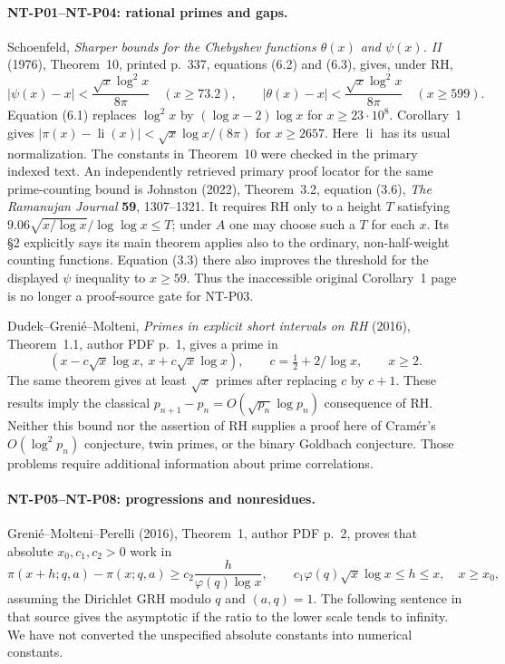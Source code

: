 \documentclass[11pt,a4paper]{article}
\begin{document}
\paragraph{NT-P01--NT-P04: rational primes and gaps.}
Schoenfeld, \emph{Sharper bounds for the Chebyshev functions
$\theta(x)$ and $\psi(x)$. II} (1976), Theorem~10, printed p.~337,
equations (6.2) and (6.3), gives, under RH,
\[
 |\psi(x)-x|<\frac{\sqrt{x}\log^2x}{8\pi}\quad(x\ge73.2),\qquad
 |\theta(x)-x|<\frac{\sqrt{x}\log^2x}{8\pi}\quad(x\ge599).
\]
Equation (6.1) replaces $\log^2x$ by $(\log x-2)\log x$ for
$x\ge23\cdot10^8$.  Corollary~1 gives
$|\pi(x)-\operatorname{li}(x)|<\sqrt{x}\log x/(8\pi)$ for
$x\ge2657$.  Here $\operatorname{li}$ has its usual normalization.
The constants in Theorem~10 were checked in the primary indexed text.
An independently retrieved primary proof locator for the same
prime-counting bound is Johnston (2022), Theorem~3.2, equation (3.6),
\emph{The Ramanujan Journal} \textbf{59}, 1307--1321.
It requires RH only to a height $T$ satisfying
$9.06\sqrt{x/\log x}/\log\log x\le T$; under $A$ one may choose
such a $T$ for each $x$.  Its \S2 explicitly says its main theorem applies
also to the ordinary, non-half-weight counting functions.  Equation (3.3)
there also improves the threshold for the displayed $\psi$ inequality
to $x\ge59$.  Thus the inaccessible original Corollary~1 page is no
longer a proof-source gate for NT-P03.

Dudek--Greni\'e--Molteni, \emph{Primes in explicit short intervals on RH}
(2016), Theorem~1.1, author PDF p.~1, gives a prime in
\[
 (x-c\sqrt{x}\log x,\ x+c\sqrt{x}\log x),
 \qquad c=\tfrac12+2/\log x,\qquad x\ge2.
\]
The same theorem gives at least $\sqrt{x}$ primes after replacing $c$ by
$c+1$.  These results imply the classical
$p_{n+1}-p_n=O(\sqrt{p_n}\log p_n)$ consequence of RH.  Neither this
bound nor the assertion of RH supplies a proof here of Cram\'er's
$O(\log^2p_n)$ conjecture, twin primes, or the binary Goldbach conjecture.
Those problems require additional information about prime correlations.

\paragraph{NT-P05--NT-P08: progressions and nonresidues.}
Greni\'e--Molteni--Perelli (2016), Theorem~1, author PDF p.~2, proves that
absolute $x_0,c_1,c_2>0$ work in
\[
 \pi(x+h;q,a)-\pi(x;q,a)\ge
 c_2\frac{h}{\varphi(q)\log x},\qquad
 c_1\varphi(q)\sqrt{x}\log x\le h\le x,\quad x\ge x_0,
\]
assuming the Dirichlet GRH modulo $q$ and $(a,q)=1$.  The following
sentence in that source gives the asymptotic if the ratio to the lower
scale tends to infinity.  We have not converted the unspecified absolute
constants into numerical constants.
\end{document}
